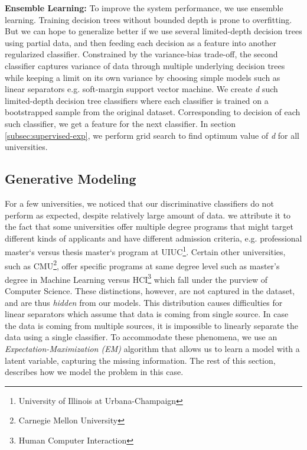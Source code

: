 \documentclass{sig-alternate-05-2015}
\begin{document}
\textbf{Ensemble Learning:}
To improve the system performance, we use ensemble learning. Training decision trees without bounded depth is prone to overfitting. But we can hope to generalize better if we use several limited-depth decision trees using partial data, and then feeding each decision as a feature into another regularized classifier. Constrained by the variance-bias trade-off, the second classifier captures variance of data through multiple underlying decision trees while keeping a limit on its own variance by choosing simple models such as linear separators e.g. soft-margin support vector machine. We create \textit{d} such limited-depth decision tree classifiers where each classifier is trained on a bootstrapped sample from the original dataset. Corresponding to decision of each such classifier, we get a feature for the next classifier. In section \ref{subsec:supervised-exp}, we perform grid search to find optimum value of \textit{d} for all universities.



\subsection{Generative Modeling}
\label{subsec:generative-modeling}
For a few universities, we noticed that our discriminative classifiers do not perform as expected, despite relatively large amount of data. we attribute it to the fact that some universities offer multiple degree programs that might target different kinds of applicants and have different admission criteria, e.g. professional master`s versus thesis master`s program at UIUC\footnote{University of Illinois at Urbana-Champaign}. Certain other universities, such as CMU\footnote{Carnegie Mellon University}, offer specific programs at same degree level such as master's degree in Machine Learning versus HCI\footnote{Human Computer Interaction} which fall under the purview of Computer Science. These distinctions, however, are not captured in the dataset, and are thus \textit{hidden} from our models. This distribution causes difficulties for linear separators which assume that data is coming from single source. In case the data is coming from multiple sources, it is impossible to linearly separate the data using a single classifier. To accommodate these phenomena, we use an \textit{Expectation-Maximization (EM)} algorithm that allows us to learn a model with a latent variable, capturing the missing information. The rest of this section, describes how we model the problem in this case.
\end{document}
